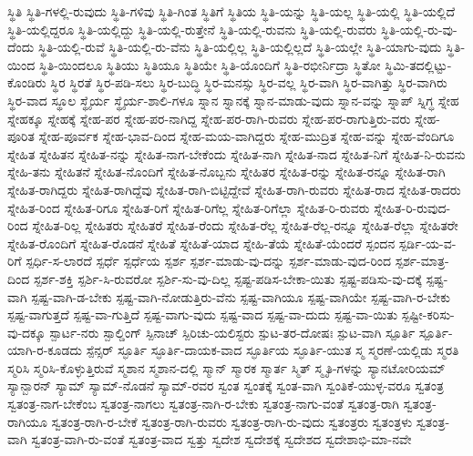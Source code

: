 {ಸ್ಥಿತಿ
ಸ್ಥಿತಿ-ಗಳಲ್ಲಿ-ರುವುದು
ಸ್ಥಿತಿ-ಗಳಿವು
ಸ್ಥಿತಿ-ಗಿಂತ
ಸ್ಥಿತಿಗೆ
ಸ್ಥಿತಿಯ
ಸ್ಥಿತಿ-ಯನ್ನು
ಸ್ಥಿತಿ-ಯಲ್ಲ
ಸ್ಥಿತಿ-ಯಲ್ಲಿ
ಸ್ಥಿತಿ-ಯಲ್ಲಿದೆ
ಸ್ಥಿತಿ-ಯಲ್ಲಿದ್ದರೂ
ಸ್ಥಿತಿ-ಯಲ್ಲಿದ್ದು
ಸ್ಥಿತಿ-ಯಲ್ಲಿ-ರುತ್ತೇನೆ
ಸ್ಥಿತಿ-ಯಲ್ಲಿ-ರುವನು
ಸ್ಥಿತಿ-ಯಲ್ಲಿ-ರುವರು
ಸ್ಥಿತಿ-ಯಲ್ಲಿ-ರು-ವು-ದೆಂದು
ಸ್ಥಿತಿ-ಯಲ್ಲಿ-ರುವೆ
ಸ್ಥಿತಿ-ಯಲ್ಲಿ-ರು-ವೆನು
ಸ್ಥಿತಿ-ಯಲ್ಲಿಲ್ಲ
ಸ್ಥಿತಿ-ಯಲ್ಲಿಲ್ಲದೆ
ಸ್ಥಿತಿ-ಯಲ್ಲೇ
ಸ್ಥಿತಿ-ಯಾಗು-ವುದು
ಸ್ಥಿತಿ-ಯಿಂದ
ಸ್ಥಿತಿ-ಯಿಂದಲೂ
ಸ್ಥಿತಿಯು
ಸ್ಥಿತಿಯೂ
ಸ್ಥಿತಿಯೇ
ಸ್ಥಿತಿ-ಯೊಂದಿಗೆ
ಸ್ಥಿತಿ-ರಭೀರ್ನಿದ್ರಾ
ಸ್ಥಿತೋ
ಸ್ಥಿಮಿ-ತದಲ್ಲಿಟ್ಟು-ಕೊಂಡಿರು
ಸ್ಥಿರ
ಸ್ಥಿರತೆ
ಸ್ಥಿರ-ಪಡಿ-ಸಲು
ಸ್ಥಿರ-ಬುದ್ಧಿ
ಸ್ಥಿರ-ಮನಸ್ಸು
ಸ್ಥಿರ-ವಲ್ಲ
ಸ್ಥಿರ-ವಾಗಿ
ಸ್ಥಿರ-ವಾಗಿತ್ತು
ಸ್ಥಿರ-ವಾಗಿರು
ಸ್ಥಿರ-ವಾದ
ಸ್ಥೂಲ
ಸ್ಥೈರ್ಯ
ಸ್ಥೈರ್ಯ-ಶಾಲಿ-ಗಳೂ
ಸ್ನಾನ
ಸ್ನಾನಕ್ಕೆ
ಸ್ನಾನ-ಮಾಡು-ವುದು
ಸ್ನಾನ-ವನ್ನು
ಸ್ನಾಪ್
ಸ್ನಿಗ್ಧ
ಸ್ನೇಹ
ಸ್ನೇಹಕ್ಕೂ
ಸ್ನೇಹಕ್ಕೆ
ಸ್ನೇಹ-ಪರ
ಸ್ನೇಹ-ಪರ-ನಾಗಿದ್ದ
ಸ್ನೇಹ-ಪರ-ರಾಗಿ-ರುವರು
ಸ್ನೇಹ-ಪರ-ರಾಗುತ್ತಿರು-ವರು
ಸ್ನೇಹ-ಪೂರಿತ
ಸ್ನೇಹ-ಪೂರ್ವಕ
ಸ್ನೇಹ-ಭಾವ-ದಿಂದ
ಸ್ನೇಹ-ಮಯ-ವಾಗಿದ್ದರು
ಸ್ನೇಹ-ಮುದ್ರಿತ
ಸ್ನೇಹ-ವನ್ನು
ಸ್ನೇಹ-ವೆಂದಿಗೂ
ಸ್ನೇಹಿತ
ಸ್ನೇಹಿತನ
ಸ್ನೇಹಿತ-ನನ್ನು
ಸ್ನೇಹಿತ-ನಾಗ-ಬೇಕೆಂದು
ಸ್ನೇಹಿತ-ನಾಗಿ
ಸ್ನೇಹಿತ-ನಾದ
ಸ್ನೇಹಿತ-ನಿಗೆ
ಸ್ನೇಹಿತ-ನಿ-ರುವನು
ಸ್ನೇಹಿ-ತನು
ಸ್ನೇಹಿತನೆ
ಸ್ನೇಹಿತ-ನೊಂದಿಗೆ
ಸ್ನೇಹಿತ-ನೊಬ್ಬನು
ಸ್ನೇಹಿತರ
ಸ್ನೇಹಿತ-ರನ್ನು
ಸ್ನೇಹಿತ-ರನ್ನೂ
ಸ್ನೇಹಿತ-ರಾಗಿ
ಸ್ನೇಹಿತ-ರಾಗಿದ್ದರು
ಸ್ನೇಹಿತ-ರಾಗಿದ್ದೆವು
ಸ್ನೇಹಿತ-ರಾಗಿ-ಬಿಟ್ಟಿದ್ದೇವೆ
ಸ್ನೇಹಿತ-ರಾಗಿ-ರುವರು
ಸ್ನೇಹಿತ-ರಾದ
ಸ್ನೇಹಿತ-ರಾದರು
ಸ್ನೇಹಿತ-ರಿಂದ
ಸ್ನೇಹಿತ-ರಿಗೂ
ಸ್ನೇಹಿತ-ರಿಗೆ
ಸ್ನೇಹಿತ-ರಿಗೆಲ್ಲ
ಸ್ನೇಹಿತ-ರಿಗೆಲ್ಲಾ
ಸ್ನೇಹಿತ-ರಿ-ರುವರು
ಸ್ನೇಹಿತ-ರಿ-ರುವುದ-ರಿಂದ
ಸ್ನೇಹಿತ-ರಿಲ್ಲ
ಸ್ನೇಹಿತರು
ಸ್ನೇಹಿತರೆ
ಸ್ನೇಹಿತ-ರೆಂದು
ಸ್ನೇಹಿತ-ರೆಲ್ಲ
ಸ್ನೇಹಿತ-ರೆಲ್ಲ-ರನ್ನೂ
ಸ್ನೇಹಿತ-ರೆಲ್ಲಾ
ಸ್ನೇಹಿತರೇ
ಸ್ನೇಹಿತ-ರೊಂದಿಗೆ
ಸ್ನೇಹಿತ-ರೊಡನೆ
ಸ್ನೇಹಿತೆ
ಸ್ನೇಹಿತೆ-ಯಾದ
ಸ್ನೇಹಿ-ತೆಯೆ
ಸ್ನೇಹಿತೆ-ಯೆಂದರೆ
ಸ್ಪಂದನ
ಸ್ಪರ್ಡಿ-ಯ-ವ-ರಿಗೆ
ಸ್ಪರ್ಧಿ-ಸ-ಲಾರದೆ
ಸ್ಪರ್ಧೆ
ಸ್ಪರ್ಧೆಯ
ಸ್ಪರ್ಶ
ಸ್ಪರ್ಶ-ಮಾಡು-ವು-ದನ್ನು
ಸ್ಪರ್ಶ-ಮಾಡು-ವುದ-ರಿಂದ
ಸ್ಪರ್ಶ-ಮಾತ್ರ-ದಿಂದ
ಸ್ಪರ್ಶ-ಶಕ್ತಿ
ಸ್ಪರ್ಶಿ-ಸಿ-ರುವರೋ
ಸ್ಪರ್ಶಿ-ಸು-ವು-ದಿಲ್ಲ
ಸ್ಪಷ್ಟ-ಪಡಿಸ-ಬೇಕಾ-ಯಿತು
ಸ್ಪಷ್ಟ-ಪಡಿಸು-ವು-ದಕ್ಕೆ
ಸ್ಪಷ್ಟ-ವಾಗಿ
ಸ್ಪಷ್ಟ-ವಾಗಿ-ಡ-ಬೇಕು
ಸ್ಪಷ್ಟ-ವಾಗಿ-ನೋಡುತ್ತಿರು-ವೆನು
ಸ್ಪಷ್ಟ-ವಾಗಿಯೂ
ಸ್ಪಷ್ಟ-ವಾಗಿಯೇ
ಸ್ಪಷ್ಟ-ವಾಗಿ-ರ-ಬೇಕು
ಸ್ಪಷ್ಟ-ವಾಗುತ್ತದೆ
ಸ್ಪಷ್ಟ-ವಾ-ಗುತ್ತಿದೆ
ಸ್ಪಷ್ಟ-ವಾಗು-ವುದು
ಸ್ಪಷ್ಟ-ವಾದ
ಸ್ಪಷ್ಟ-ವಾ-ದುದು
ಸ್ಪಷ್ಟ-ವಾ-ಯಿತು
ಸ್ಪಷ್ಟೀ-ಕರಿಸು-ವು-ದಕ್ಕೂ
ಸ್ಪಾರ್ಟ-ನರು
ಸ್ಪಾಲ್ಡಿಂಗ್
ಸ್ಪಿನಾಚ್
ಸ್ಪಿರಿಚು-ಯಲಿಸ್ಟರು
ಸ್ಪುಟ-ತರ-ದೋಷಃ
ಸ್ಪುಟ-ವಾಗಿ
ಸ್ಪೂರ್ತಿ
ಸ್ಪೂರ್ತಿ-ಯಾಗಿ-ರ-ಕೂಡದು
ಸ್ಪೆನ್ಸರ್
ಸ್ಫೂರ್ತಿ
ಸ್ಫೂರ್ತಿ-ದಾಯಕ-ವಾದ
ಸ್ಫೂರ್ತಿಯ
ಸ್ಫೂರ್ತಿ-ಯುತ
ಸ್ಮ
ಸ್ಮರಣೆ-ಯಲ್ಲಿಡು
ಸ್ಮರತಿ
ಸ್ಮರಿಸಿ
ಸ್ಮರಿಸಿ-ಕೊಳ್ಳುತ್ತಿರುವೆ
ಸ್ಮಶಾನ
ಸ್ಮಶಾನ-ದಲ್ಲಿ
ಸ್ಮಾನ್
ಸ್ಮಾರಕ
ಸ್ಮಾರ್ತ
ಸ್ಮಿತ್
ಸ್ಮೃತಿ-ಗಳನ್ನು
ಸ್ಯಾನಟೋರಿಯಮ್
ಸ್ಯಾನ್ಬಾರನ್
ಸ್ಯಾಮ್
ಸ್ಯಾಮ್-ನೊಡನೆ
ಸ್ಯಾಮ್-ರವರ
ಸ್ವಂತ
ಸ್ವಂತಕ್ಕೆ
ಸ್ವಂತ-ವಾಗಿ
ಸ್ವಂತಿಕೆ-ಯುಳ್ಳ-ವರೂ
ಸ್ವತಂತ್ರ
ಸ್ವತಂತ್ರ-ನಾಗ-ಬೇಕೆಂಬ
ಸ್ವತಂತ್ರ-ನಾಗಲು
ಸ್ವತಂತ್ರ-ನಾಗಿ-ರ-ಬೇಕು
ಸ್ವತಂತ್ರ-ನಾಗು-ವಂತೆ
ಸ್ವತಂತ್ರ-ರಾಗಿ
ಸ್ವತಂತ್ರ-ರಾಗಿಯೂ
ಸ್ವತಂತ್ರ-ರಾಗಿ-ರ-ಬೇಕೆ
ಸ್ವತಂತ್ರ-ರಾಗಿ-ರುವರು
ಸ್ವತಂತ್ರ-ರಾಗಿ-ರು-ವುದು
ಸ್ವತಂತ್ರರು
ಸ್ವತಂತ್ರಳು
ಸ್ವತಂತ್ರ-ವಾಗಿ
ಸ್ವತಂತ್ರ-ವಾಗಿ-ರು-ವಂತೆ
ಸ್ವತಂತ್ರ-ವಾದ
ಸ್ವತ್ತು
ಸ್ವದೇಶ
ಸ್ವದೇಶಕ್ಕೆ
ಸ್ವದೇಶದ
ಸ್ವದೇಶಾಭಿ-ಮಾ-ನವೇ
}
